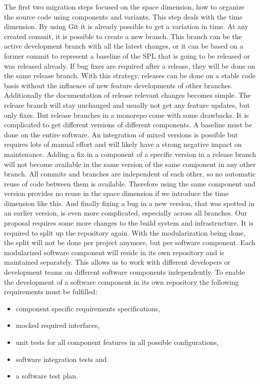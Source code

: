 The first two migration steps focused on the space dimension, how to organize
the source code using components and variants. This step deals with the time
dimension. By using Git it is already possible to get a variation in time. At
any created commit, it is possible to create a new branch. This branch can be
the active development branch with all the latest changes, or it can be based on
a former commit to represent a baseline of the SPL that is going to be released
or was released already. If bug fixes are required after a release, they will be
done on the same release branch. With this strategy, releases can be done on a
stable code basis without the influence of new feature developments of other
branches. Additionally the documentation of release relevant changes becomes
simple. The release branch will stay unchanged and usually not get any feature
updates, but only fixes. But release branches in a monorepo come with some
drawbacks. It is complicated to get different versions of different components.
A baseline must be done on the entire software. An integration of mixed versions
is possible but requires lots of manual effort and will likely have a strong
negative impact on maintenance. Adding a fix in a component of a specific
version in a release branch will not become available in the same version of the
same component in any other branch. All commits and branches are independent of
each other, so no automatic reuse of code between them is available. Therefore
using the same component and version provides no reuse in the space dimension if
we introduce the time dimension like this. And finally fixing a bug in a new
version, that was spotted in an earlier version, is even more complicated,
especially across all branches. Our proposal requires some more changes to the
build system and infrastructure. It is required to split up the repository
again. With the modularization being done, the split will not be done per
project anymore, but per software component. Each modularized software component
will reside in its own repository and is maintained separately. This allows us
to work with different developers or development teams on different software
components independently. To enable the development of a software component in
its own repository the following requirements must be fulfilled:
\begin{itemize}
  \item component specific requirements specifications,
  \item mocked required interfaces,
  \item unit tests for all component features in all possible configurations,
  \item software integration tests and
  \item a software test plan.
\end{itemize}
